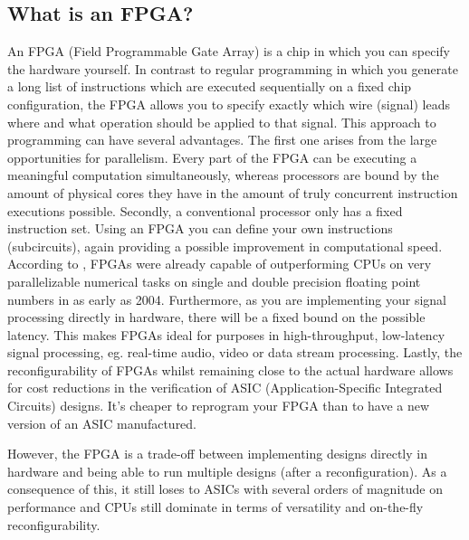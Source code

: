 \subsection{What is an FPGA?}
An FPGA (Field Programmable Gate Array) is a chip in which you can specify the hardware yourself. In contrast to regular programming in which you generate a long list of instructions which are executed sequentially on a fixed chip configuration, the FPGA allows you to specify exactly which wire (signal) leads where and what operation should be applied to that signal. This approach to programming can have several advantages. The first one arises from the large opportunities for parallelism. Every part of the FPGA can be executing a meaningful computation simultaneously, whereas processors are bound by the amount of physical cores they have in the amount of truly concurrent instruction executions possible. Secondly, a conventional processor only has a fixed instruction set. Using an FPGA you can define your own instructions (subcircuits), again providing a possible improvement in computational speed. According to \cite{FPGAvsCPU}, FPGAs were already capable of outperforming CPUs on very parallelizable numerical tasks on single and double precision floating point numbers in as early as 2004. Furthermore, as you are implementing your signal processing directly in hardware, there will be a fixed bound on the possible latency. This makes FPGAs ideal for purposes in high-throughput, low-latency signal processing, eg. real-time audio, video or data stream processing. Lastly, the reconfigurability of FPGAs whilst remaining close to the actual hardware allows for cost reductions in the verification of ASIC (Application-Specific Integrated Circuits) designs. It's cheaper to reprogram your FPGA than to have a new version of an ASIC manufactured.

However, the FPGA is a trade-off between implementing designs directly in hardware and being able to run multiple designs (after a reconfiguration). As a consequence of this, it still loses to ASICs with several orders of magnitude on performance \cite{FPGAvsASIC} and CPUs still dominate in terms of versatility and on-the-fly reconfigurability.

